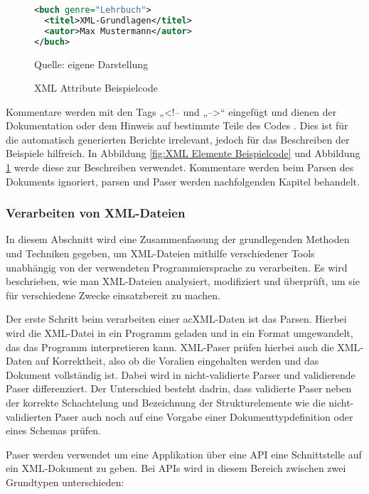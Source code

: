 \begin{figure}[H]
\centering
\begin{minipage}{0.95\textwidth}
\begin{lstlisting}[language=XML]
<buch genre="Lehrbuch">
  <titel>XML-Grundlagen</titel>
  <autor>Max Mustermann</autor>
</buch>
\end{lstlisting}
\end{minipage}
\caption{XML Attribute Beispielcode}
\label{fig:XML Attribute Beispielcode}
    {Quelle: eigene Darstellung}
\end{figure}


Kommentare werden mit den Tags „<!-- und „-->“ eingefügt und dienen der Dokumentation oder dem Hinweis auf bestimmte Teile des Codes \cite*[10-14]{Becher2022}.
Dies ist für die automatisch generierten Berichte irrelevant, jedoch für das Beschreiben der Beispiele hilfreich.
In Abbildung \ref{fig:XML Elemente Beispielcode} und Abbildung \ref{fig:XML Attribute Beispielcode} werde diese zur Beschreiben verwendet.
Kommentare werden beim Parsen des Dokuments ignoriert, parsen und Paser werden nachfolgenden Kapitel behandelt.

\subsubsection{Verarbeiten von XML-Dateien}

In diesem Abschnitt wird eine Zusammenfassung der grundlegenden Methoden und Techniken gegeben,
um \ac{XML}-Dateien mithilfe verschiedener Tools unabhängig von der verwendeten Programmiersprache zu verarbeiten.
Es wird beschrieben, wie man \ac{XML}-Dateien analysiert, modifiziert und überprüft, um sie für verschiedene Zwecke einsatzbereit zu machen.

Der erste Schritt beim verarbeiten einer ac{XML}-Daten ist das Parsen.
Hierbei wird die \ac{XML}-Datei in ein Programm geladen und in ein Format umgewandelt, das das Programm interpretieren kann.
XML-Paser prüfen hierbei auch die \ac{XML}-Daten auf Korrektheit, also ob die Voralien eingehalten werden und das Dokument vollständig ist.
Dabei wird in nicht-validierte Parser und validierende Paser differenziert.
Der Unterschied besteht dadrin, dass validierte Paser neben der  korrekte Schachtelung und Bezeichnung der Strukturelemente
wie die nicht-validierten Paser auch noch auf eine Vorgabe einer Dokumenttypdefinition oder eines Schemas prüfen.\cite*[10]{Becher2022}

Paser werden verwendet um eine Applikation über eine \ac{API} eine Schnittstelle auf ein \ac{XML}-Dokument zu geben.
Bei \ac{API}s wird in diesem Bereich zwischen zwei Grundtypen unterschieden:\cite*[405]{Becher2022}

